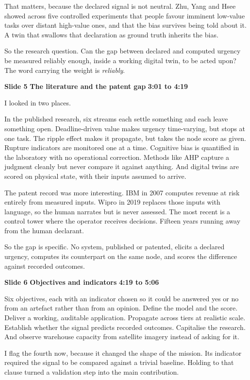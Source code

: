 \documentclass[a4paper,12pt]{article}
\newcommand{\SlideHeading}[3]{%
  \needspace{4\baselineskip}%
  \vspace{10pt}%
  \noindent\colorbox{altenBlueBg}{%
    \parbox{\dimexpr\linewidth-2\fboxsep}{%
      \vspace{3pt}%
      \textbf{\large\color{altenNavy}#1}\quad
      \textbf{\large\color{altenAzureDark}#2}%
      \hfill\textbf{\color{altenAzure}#3}%
      \vspace{3pt}}}%
  \vspace{5pt}\par}
\begin{document}
That matters, because the declared signal is not neutral. Zhu, Yang and Hsee showed across five controlled experiments that people favour imminent low-value tasks over distant high-value ones, and that the bias survives being told about it. A twin that swallows that declaration as ground truth inherits the bias.

So the research question. Can the gap between declared and computed urgency be measured reliably enough, inside a working digital twin, to be acted upon? The word carrying the weight is \emph{reliably}.

\SlideHeading{Slide 5}{The literature and the patent gap}{3:01 to 4:19}
I looked in two places.

In the published research, six streams each settle something and each leave something open. Deadline-driven value makes urgency time-varying, but stops at one task. The ripple effect makes it propagate, but takes the node score as given. Rupture indicators are monitored one at a time. Cognitive bias is quantified in the laboratory with no operational correction. Methods like AHP capture a judgment cleanly but never compare it against anything. And digital twins are scored on physical state, with their inputs assumed to arrive.

The patent record was more interesting. IBM in 2007 computes revenue at risk entirely from measured inputs. Wipro in 2019 replaces those inputs with language, so the human narrates but is never assessed. The most recent is a control tower where the operator receives decisions. Fifteen years running away from the human declarant.

So the gap is specific. No system, published or patented, elicits a declared urgency, computes its counterpart on the same node, and scores the difference against recorded outcomes.

\SlideHeading{Slide 6}{Objectives and indicators}{4:19 to 5:06}
Six objectives, each with an indicator chosen so it could be answered yes or no from an artefact rather than from an opinion. Define the model and the score. Deliver a working, auditable application. Propagate across tiers at realistic scale. Establish whether the signal predicts recorded outcomes. Capitalise the research. And observe warehouse capacity from satellite imagery instead of asking for it.

I flag the fourth now, because it changed the shape of the mission. Its indicator required the signal to be compared against a trivial baseline. Holding to that clause turned a validation step into the main contribution.
\end{document}
